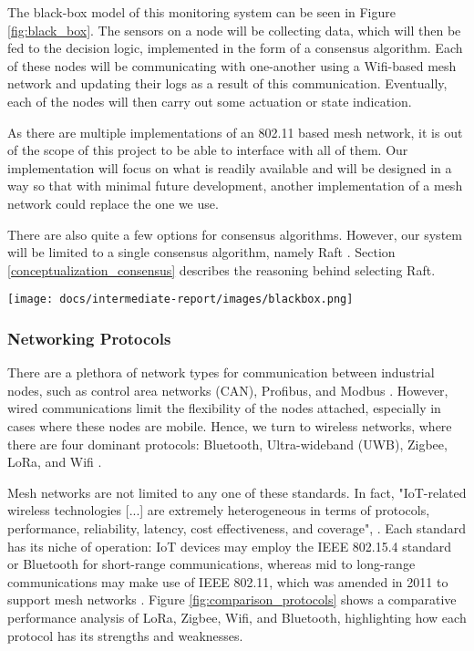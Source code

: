 \documentclass[compsoc]{IEEEtran}
\begin{document}

The black-box model of this monitoring system can be seen in Figure \ref{fig:black_box}. The sensors on a node will be collecting data, which will then be fed to the decision logic, implemented in the form of a consensus algorithm. Each of these nodes will be communicating with one-another using a Wifi-based mesh network and updating their logs as a result of this communication. Eventually, each of the nodes will then carry out some actuation or state indication.

As there are multiple implementations of an 802.11 based mesh network, it is out of the scope of this project to be able to interface with all of them. Our implementation will focus on what is readily available and will be designed in a way so that with minimal future development, another implementation of a mesh network could replace the one we use.

There are also quite a few options for consensus algorithms. However, our system will be limited to a single consensus algorithm, namely Raft \cite{raft_paper}. Section \ref{conceptualization_consensus} describes the reasoning behind selecting Raft.

\begingroup
    \centering
    \medskip
    \texttt{[image: docs/intermediate-report/images/blackbox.png]}
    \label{fig:black_box}
\endgroup

\subsubsection{Networking Protocols}
There are a plethora of network types for communication between industrial nodes, such as control area networks (CAN), Profibus, and Modbus \cite{lee2007comparative}. However, wired communications limit the flexibility of the nodes attached, especially in cases where these nodes are mobile. Hence, we turn to wireless networks, where there are four dominant protocols: Bluetooth, Ultra-wideband (UWB), Zigbee, LoRa, and Wifi \cite{lee2007comparative, ti_lethaby2017wireless}.

Mesh networks are not limited to any one of these standards. In fact, "IoT-related wireless technologies [...] are extremely heterogeneous in terms of protocols, performance, reliability, latency, cost effectiveness, and coverage",  \cite{iot_survey_cilfone2019wireless}. Each standard has its niche of operation: IoT devices may employ the IEEE 802.15.4 standard or Bluetooth for short-range communications, whereas mid to long-range communications may make use of IEEE 802.11, which was amended in 2011 to support mesh networks \cite{ti_lethaby2017wireless, iot_survey_cilfone2019wireless}. Figure \ref{fig:comparison_protocols} shows a comparative performance analysis of LoRa, Zigbee, Wifi, and Bluetooth, highlighting how each protocol has its strengths and weaknesses.
\end{document}
